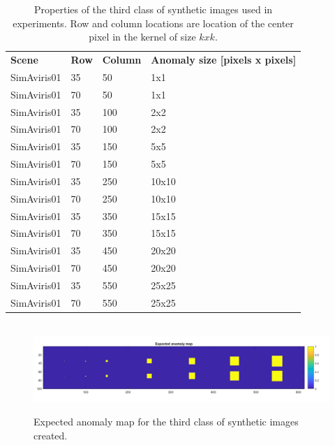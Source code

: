 \begin{table}[H]
\centering
\caption{Properties of the third class of synthetic images used in experiments. Row and column locations are location of the center pixel in the kernel of size $k x k$.}
\label{tab:synthetic_images}
\begin{tabular}{l|l|l|l}
\textbf{Scene} & \textbf{Row} & \textbf{Column} & \textbf{Anomaly size {[}pixels x pixels{]}} \\
SimAviris01    & 35           & 50              & 1x1                                         \\
SimAviris01    & 70           & 50              & 1x1                                         \\
SimAviris01    & 35           & 100             & 2x2                                         \\
SimAviris01    & 70           & 100             & 2x2                                         \\
SimAviris01    & 35           & 150             & 5x5                                         \\
SimAviris01    & 70           & 150             & 5x5                                         \\
SimAviris01    & 35           & 250             & 10x10                                       \\
SimAviris01    & 70           & 250             & 10x10                                       \\
SimAviris01   & 35           & 350             & 15x15                                       \\
SimAviris01    & 70           & 350             & 15x15                                       \\
SimAviris01    & 35           & 450             & 20x20                                       \\
SimAviris01    & 70           & 450             & 20x20                                       \\
SimAviris01    & 35           & 550             & 25x25                                       \\
SimAviris01    & 70           & 550             & 25x25                                      
\end{tabular}
\end{table}



\begin{figure}[H]
\hbox{\hspace*{-0}                                              
   \includegraphics[scale=0.4]{images/AD_testing/synthetic_images/expected_anomaly_map.png}}
  \caption{Expected anomaly map for the third class of synthetic images created.} 
  \label{fig:anomaly_map_615_100}
\end{figure}


